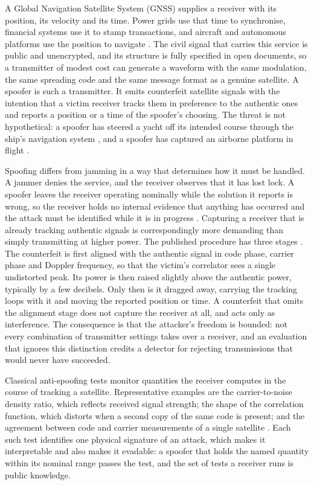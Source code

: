 \documentclass[pdflatex,sn-basic]{sn-jnl}
\theoremstyle{thmstyleone}
\theoremstyle{thmstyletwo}
\theoremstyle{thmstylethree}
\begin{document}
A Global Navigation Satellite System (GNSS) supplies a receiver with its position, its
velocity and its time. Power grids use that time to synchronise, financial systems use it
to stamp transactions, and aircraft and autonomous platforms use the position to navigate
\citep{kaplan2005understanding}. The civil signal that carries this service is public and
unencrypted, and its structure is fully specified in open documents, so a transmitter of
modest cost can generate a waveform with the same modulation, the same spreading code and
the same message format as a genuine satellite. A spoofer is such a transmitter. It emits
counterfeit satellite signals with the intention that a victim receiver tracks them in
preference to the authentic ones and reports a position or a time of the spoofer's
choosing. The threat is not hypothetical: a spoofer has steered a yacht off its intended
course through the ship's navigation system \citep{bhatti2017hostile}, and a spoofer has
captured an airborne platform in flight \citep{kerns2014uav}.

Spoofing differs from jamming in a way that determines how it must be handled. A jammer
denies the service, and the receiver observes that it has lost lock. A spoofer leaves the
receiver operating nominally while the solution it reports is wrong, so the receiver holds
no internal evidence that anything has occurred and the attack must be identified while it
is in progress \citep{psiaki2016gnss}. Capturing a receiver that is already tracking
authentic signals is correspondingly more demanding than simply transmitting at higher
power. The published procedure has three stages \citep{psiaki2016gnss,kerns2014uav}. The counterfeit is first aligned with the authentic
signal in code phase, carrier phase and Doppler frequency, so that the victim's correlator
sees a single undistorted peak. Its power is then raised slightly above the authentic
power, typically by a few decibels. Only then is it dragged away, carrying the tracking
loops with it and moving the reported position or time. A counterfeit that omits the
alignment stage does not capture the receiver at all, and acts only as interference. The
consequence is that the attacker's freedom is bounded: not every combination of transmitter
settings takes over a receiver, and an evaluation that ignores this distinction credits a
detector for rejecting transmissions that would never have succeeded.

Classical anti-spoofing tests monitor quantities the receiver computes in the course of
tracking a satellite. Representative examples are the carrier-to-noise density ratio, which
reflects received signal strength; the shape of the correlation function, which distorts
when a second copy of the same code is present; and the agreement between code and carrier
measurements of a single satellite \citep{akos2012gnss,psiaki2016gnss}. Each such test
identifies one physical signature of an attack, which makes it interpretable and also makes
it evadable: a spoofer that holds the named quantity within its nominal range passes the
test, and the set of tests a receiver runs is public knowledge.
\end{document}
